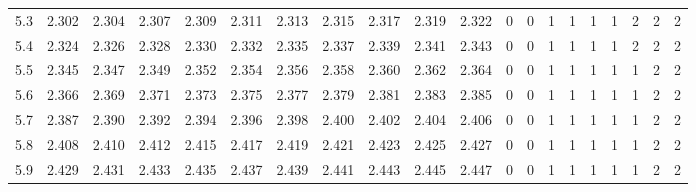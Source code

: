 \begin{table}[H]
{\begin{tabular}{|c|c|c|c|c|c|c|c|c|c|c|c|c|c|c|c|c|c|c|c|}
        5.3 & 2.302 & 2.304 & 2.307 & 2.309 & 2.311 & 2.313 & 2.315 & 2.317 & 2.319 & 2.322 & 0 & 0 & 1 & 1 & 1 & 1 & 2 & 2 & 2 \\
        5.4 & 2.324 & 2.326 & 2.328 & 2.330 & 2.332 & 2.335 & 2.337 & 2.339 & 2.341 & 2.343 & 0 & 0 & 1 & 1 & 1 & 1 & 2 & 2 & 2 \\
        5.5 & 2.345 & 2.347 & 2.349 & 2.352 & 2.354 & 2.356 & 2.358 & 2.360 & 2.362 & 2.364 & 0 & 0 & 1 & 1 & 1 & 1 & 1 & 2 & 2 \\
        5.6 & 2.366 & 2.369 & 2.371 & 2.373 & 2.375 & 2.377 & 2.379 & 2.381 & 2.383 & 2.385 & 0 & 0 & 1 & 1 & 1 & 1 & 1 & 2 & 2 \\
        5.7 & 2.387 & 2.390 & 2.392 & 2.394 & 2.396 & 2.398 & 2.400 & 2.402 & 2.404 & 2.406 & 0 & 0 & 1 & 1 & 1 & 1 & 1 & 2 & 2 \\
        5.8 & 2.408 & 2.410 & 2.412 & 2.415 & 2.417 & 2.419 & 2.421 & 2.423 & 2.425 & 2.427 & 0 & 0 & 1 & 1 & 1 & 1 & 1 & 2 & 2 \\
        5.9 & 2.429 & 2.431 & 2.433 & 2.435 & 2.437 & 2.439 & 2.441 & 2.443 & 2.445 & 2.447 & 0 & 0 & 1 & 1 & 1 & 1 & 1 & 2 & 2 \\
        \hline
    \end{tabular}%
    }
\end{table}
